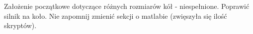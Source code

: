 Założenie początkowe dotyczące różnych rozmiarów kół - niespełnione.
Poprawić silnik na koło.
Nie zapomnij zmienić sekcji o matlabie (zwięszyła się ilość skryptów).
